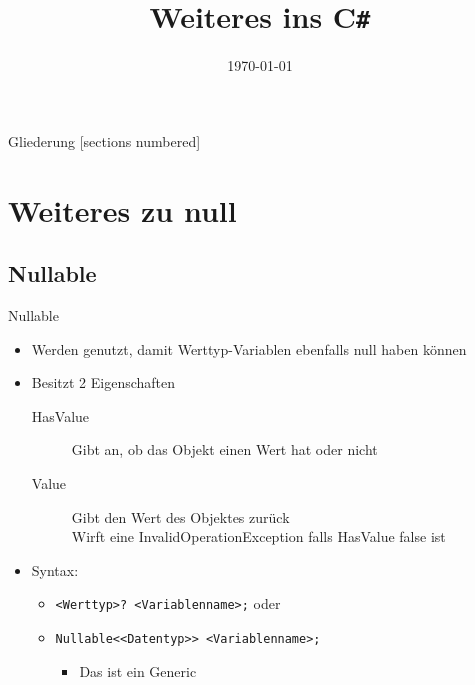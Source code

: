 



\title{Weiteres ins C\texttt{\#}}
\date{\today}




\maketitle

\begin{frame}{Gliederung}
	[sections numbered]
	\tableofcontents
\end{frame}

\section{Weiteres zu null}
\subsection{Nullable}
\begin{frame}{Nullable}
	\begin{itemize}
		\item Werden genutzt, damit Werttyp-Variablen ebenfalls \alert{null} haben können
		\item Besitzt 2 Eigenschaften
		\begin{description}
			\item[HasValue] Gibt an, ob das Objekt einen Wert hat oder nicht
			\item[Value] Gibt den Wert des Objektes zurück\\ Wirft eine InvalidOperationException falls HasValue \alert{false} ist 
		\end{description}
		\item Syntax:
		\begin{itemize}
			\item \texttt{\alert{<Werttyp>}? \alert{<Variablenname>};} oder
			\item \texttt{Nullable<\alert{<Datentyp>}> \alert{<Variablenname>};}
			\begin{itemize}
				\item Das ist ein Generic
			\end{itemize}
		\end{itemize}
	\end{itemize}
\end{frame}

